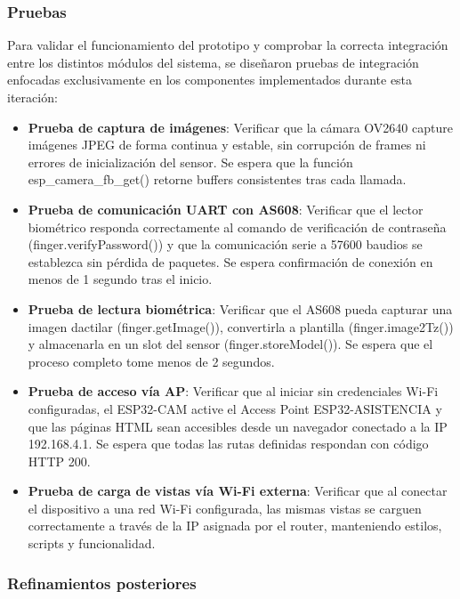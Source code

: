 \subsubsection{Pruebas}

Para validar el funcionamiento del prototipo y comprobar la correcta integración entre los distintos módulos del sistema, se diseñaron pruebas de integración enfocadas exclusivamente en los componentes implementados durante esta iteración:

\begin{itemize}
    \item \textbf{Prueba de captura de imágenes}: Verificar que la cámara OV2640 capture imágenes JPEG de forma continua y estable, sin corrupción de frames ni errores de inicialización del sensor. Se espera que la función esp\_camera\_fb\_get() retorne buffers consistentes tras cada llamada.

    \item \textbf{Prueba de comunicación UART con AS608}: Verificar que el lector biométrico responda correctamente al comando de verificación de contraseña (finger.verifyPassword()) y que la comunicación serie a 57600 baudios se establezca sin pérdida de paquetes. Se espera confirmación de conexión en menos de 1 segundo tras el inicio.

    \item \textbf{Prueba de lectura biométrica}: Verificar que el AS608 pueda capturar una imagen dactilar (finger.getImage()), convertirla a plantilla (finger.image2Tz()) y almacenarla en un slot del sensor (finger.storeModel()). Se espera que el proceso completo tome menos de 2 segundos.

    \item \textbf{Prueba de acceso vía AP}: Verificar que al iniciar sin credenciales Wi-Fi configuradas, el ESP32-CAM active el Access Point ESP32-ASISTENCIA y que las páginas HTML sean accesibles desde un navegador conectado a la IP 192.168.4.1. Se espera que todas las rutas definidas respondan con código HTTP 200.

    \item \textbf{Prueba de carga de vistas vía Wi-Fi externa}: Verificar que al conectar el dispositivo a una red Wi-Fi configurada, las mismas vistas se carguen correctamente a través de la IP asignada por el router, manteniendo estilos, scripts y funcionalidad.
\end{itemize}

\subsubsection{Refinamientos posteriores}

